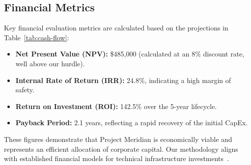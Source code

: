 \subsection{Financial Metrics}
Key financial evaluation metrics are calculated based on the projections in Table~\ref{tab:cash-flow}:
\begin{itemize}[leftmargin=1.5em]
  \item \textbf{Net Present Value (NPV):} \$485,000 (calculated at an 8\% discount rate, well above our hurdle).
  \item \textbf{Internal Rate of Return (IRR):} 24.8\%, indicating a high margin of safety.
  \item \textbf{Return on Investment (ROI):} 142.5\% over the 5-year lifecycle.
  \item \textbf{Payback Period:} 2.1 years, reflecting a rapid recovery of the initial CapEx.
\end{itemize}
These figures demonstrate that Project Meridian is economically viable and represents an efficient allocation of corporate capital. Our methodology aligns with established financial models for technical infrastructure investments~\cite{finance2024digital}.
